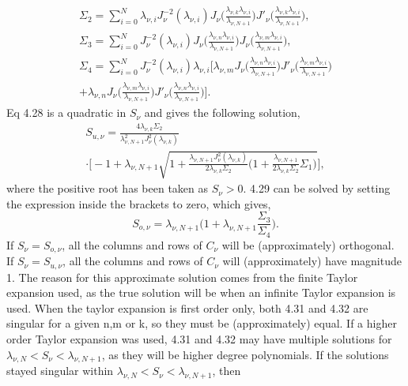 \documentclass[10pt]{article}
\numberwithin{equation}{section}
\begin{document}
\begin{multicols}{2}
\begin{multline}
\Sigma_{2} = \sum_{i=0}^{N}\lambda_{\nu,i}J^{-2}_{\nu}(\lambda_{\nu,i})J_{\nu}\bigg(\frac{\lambda_{\nu,k}\lambda_{\nu,i}}{\lambda_{\nu,N+1}}\bigg)J'_{\nu}\bigg(\frac{\lambda_{\nu,k}\lambda_{\nu,i}}{\lambda_{\nu,N+1}}\bigg),\\
\Sigma_{3} = \sum_{i=0}^{N}J^{-2}_{\nu}(\lambda_{\nu,i})J_{\nu}\bigg(\frac{\lambda_{\nu,n}\lambda_{\nu,i}}{\lambda_{\nu,N+1}}\bigg)J_{\nu}\bigg(\frac{\lambda_{\nu,m}\lambda_{\nu,i}}{\lambda_{\nu,N+1}}\bigg),\\
\Sigma_{4} = \sum_{i=0}^{N}J^{-2}_{\nu}(\lambda_{\nu,i})\lambda_{\nu,i}\bigg[\lambda_{\nu,m}J_{\nu}\bigg(\frac{\lambda_{\nu,n}\lambda_{\nu,i}}{\lambda_{\nu,N+1}}\bigg)J'_{\nu}\bigg(\frac{\lambda_{\nu,m}\lambda_{\nu,i}}{\lambda_{\nu,N+1}}\bigg)\\+\lambda_{\nu,n}J_{\nu}\bigg(\frac{\lambda_{\nu,m}\lambda_{\nu,i}}{\lambda_{\nu,N+1}}\bigg)J'_{\nu}\bigg(\frac{\lambda_{\nu,n}\lambda_{\nu,i}}{\lambda_{\nu,N+1}}\bigg)\bigg].
\end{multline}
Eq 4.28 is a quadratic in $S_{\nu}$ and gives the following solution,
\begin{multline}
S_{u,\nu} = \frac{4\lambda_{\nu,k}\Sigma_{2}}{\lambda^{2}_{\nu,N+1}J^{2}_{\nu}(\lambda_{\nu,k})} \\ \cdot\bigg[-1+\lambda_{\nu,N+1}\sqrt{1+\frac{\lambda_{\nu,N+1}J^{2}_{\nu}(\lambda_{\nu,k})}{2\lambda_{\nu,k}\Sigma_{2}}\bigg(1+\frac{\lambda_{\nu,N+1}}{2\lambda_{\nu,k}\Sigma_{2}}\Sigma_{1}\bigg)}\bigg],
\end{multline}
where the positive root has been taken as  $S_{\nu}>0$. 4.29 can be solved by setting the expression inside the brackets to zero, which gives,
\begin{equation}
S_{o,\nu} = \lambda_{\nu,N+1}\bigg(1+\lambda_{\nu,N+1}\frac{\Sigma_{3}}{\Sigma_{4}}\bigg).
\end{equation}
If $S_{\nu}=S_{o,\nu}$, all the columns and rows of $C_{\nu}$ will be (approximately) orthogonal. If $S_{\nu}=S_{u,\nu}$, all the columns and rows of $C_{\nu}$ will (approximately) have magnitude 1. The reason for this approximate solution comes from the finite Taylor expansion used, as the true solution will be when an infinite Taylor expansion is used. When the taylor expansion is first order only, both 4.31 and 4.32 are singular for a given n,m or k, so they must be (approximately) equal. If a higher order Taylor expansion was used, 4.31 and 4.32 may have multiple solutions for $\lambda_{\nu,N}<S_{\nu}<\lambda_{\nu,N+1}$, as they will be higher degree polynomials. If the solutions stayed singular within $\lambda_{\nu,N}<S_{\nu}<\lambda_{\nu,N+1}$, then

\end{multicols}
\end{document}
